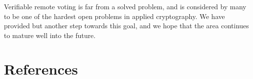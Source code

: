 \documentclass[12pt,a4paper]{article}
\theoremstyle{definition}
\begin{document}
Verifiable remote voting is far from a solved problem, and is considered by many to be one of the hardest open problems in applied cryptography. We have provided but another step towards this goal, and we hope that the area continues to mature well into the future.
\newpage
\section{References}


\newpage
\end{document}
